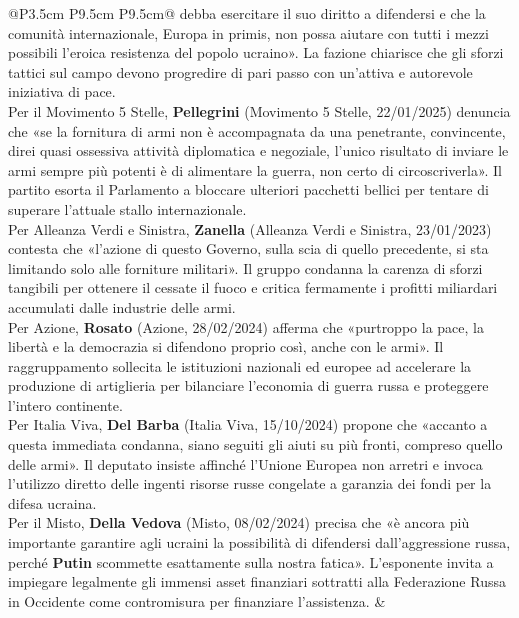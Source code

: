 \documentclass[a4paper,11pt]{article}
\begin{document}
\begin{landscape}
\begin{longtable}{@{}P{3.5cm} P{9.5cm} P{9.5cm}@{}}
debba esercitare il suo diritto a difendersi e che la comunità internazionale, Europa in primis, non possa aiutare con tutti i mezzi possibili l'eroica resistenza del popolo ucraino». La fazione chiarisce che gli sforzi tattici sul campo devono progredire di pari passo con un'attiva e autorevole iniziativa di pace.\\[6pt] Per il Movimento 5 Stelle, \textbf{Pellegrini} (Movimento 5 Stelle, 22/01/2025) denuncia che «se la fornitura di armi non è accompagnata da una penetrante, convincente, direi quasi ossessiva attività diplomatica e negoziale, l'unico risultato di inviare le armi sempre più potenti è di alimentare la guerra, non certo di circoscriverla». Il partito esorta il Parlamento a bloccare ulteriori pacchetti bellici per tentare di superare l'attuale stallo internazionale.\\[6pt] Per Alleanza Verdi e Sinistra, \textbf{Zanella} (Alleanza Verdi e Sinistra, 23/01/2023) contesta che «l'azione di questo Governo, sulla scia di quello precedente, si sta limitando solo alle forniture militari». Il gruppo condanna la carenza di sforzi tangibili per ottenere il cessate il fuoco e critica fermamente i profitti miliardari accumulati dalle industrie delle armi.\\[6pt] Per Azione, \textbf{Rosato} (Azione, 28/02/2024) afferma che «purtroppo la pace, la libertà e la democrazia si difendono proprio così, anche con le armi». Il raggruppamento sollecita le istituzioni nazionali ed europee ad accelerare la produzione di artiglieria per bilanciare l'economia di guerra russa e proteggere l'intero continente.\\[6pt] Per Italia Viva, \textbf{Del Barba} (Italia Viva, 15/10/2024) propone che «accanto a questa immediata condanna, siano seguiti gli aiuti su più fronti, compreso quello delle armi». Il deputato insiste affinché l'Unione Europea non arretri e invoca l'utilizzo diretto delle ingenti risorse russe congelate a garanzia dei fondi per la difesa ucraina.\\[6pt] Per il Misto, \textbf{Della Vedova} (Misto, 08/02/2024) precisa che «è ancora più importante garantire agli ucraini la possibilità di difendersi dall'aggressione russa, perché \textbf{Putin} scommette esattamente sulla nostra fatica». L'esponente invita a impiegare legalmente gli immensi asset finanziari sottratti alla Federazione Russa in Occidente come contromisura per finanziare l'assistenza. & \\
\midrule

\end{longtable}
\end{landscape}
\end{document}
